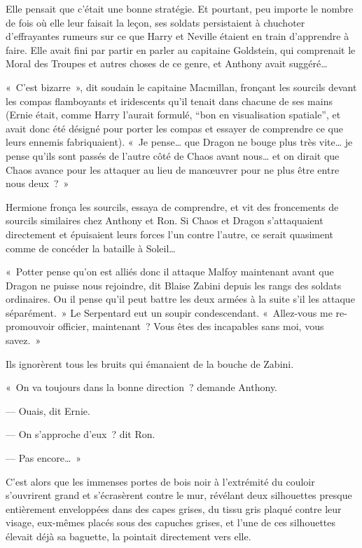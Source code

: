 Elle pensait que c'était une bonne stratégie. Et pourtant, peu importe le nombre de fois où elle leur faisait la leçon, ses soldats persistaient à chuchoter d'effrayantes rumeurs sur ce que Harry et Neville étaient en train d'apprendre à faire. Elle avait fini par partir en parler au capitaine Goldstein, qui comprenait le Moral des Troupes et autres choses de ce genre, et Anthony avait suggéré…

«~C'est bizarre~», dit soudain le capitaine Macmillan, fronçant les sourcils devant les compas flamboyants et iridescents qu'il tenait dans chacune de ses mains (Ernie était, comme Harry l'aurait formulé, “bon en visualisation spatiale”, et avait donc été désigné pour porter les compas et essayer de comprendre ce que leurs ennemis fabriquaient). «~Je pense… que Dragon ne bouge plus très vite… je pense qu'ils sont passés de l'autre côté de Chaos avant nous… et on dirait que Chaos avance pour les attaquer au lieu de manœuvrer pour ne plus être entre nous deux~?~»

Hermione fronça les sourcils, essaya de comprendre, et vit des froncements de sourcils similaires chez Anthony et Ron. Si Chaos et Dragon s'attaquaient directement et épuisaient leurs forces l'un contre l'autre, ce serait quasiment comme de concéder la bataille à Soleil…

«~Potter pense qu'on est alliés donc il attaque Malfoy maintenant avant que Dragon ne puisse nous rejoindre, dit Blaise Zabini depuis les rangs des soldats ordinaires. Ou il pense qu'il peut battre les deux armées à la suite s'il les attaque séparément.~» Le Serpentard eut un soupir condescendant. «~Allez-vous me re-promouvoir officier, maintenant~? Vous êtes des incapables sans moi, vous savez.~»

Ils ignorèrent tous les bruits qui émanaient de la bouche de Zabini.

«~On va toujours dans la bonne direction~? demande Anthony.

--- Ouais, dit Ernie.

--- On s'approche d'eux~? dit Ron.

--- Pas encore…~»

C'est alors que les immenses portes de bois noir à l'extrémité du couloir s'ouvrirent grand et s'écrasèrent contre le mur, révélant deux silhouettes presque entièrement enveloppées dans des capes grises, du tissu gris plaqué contre leur visage, eux-mêmes placés sous des capuches grises, et l'une de ces silhouettes élevait déjà sa baguette, la pointait directement vers elle.


